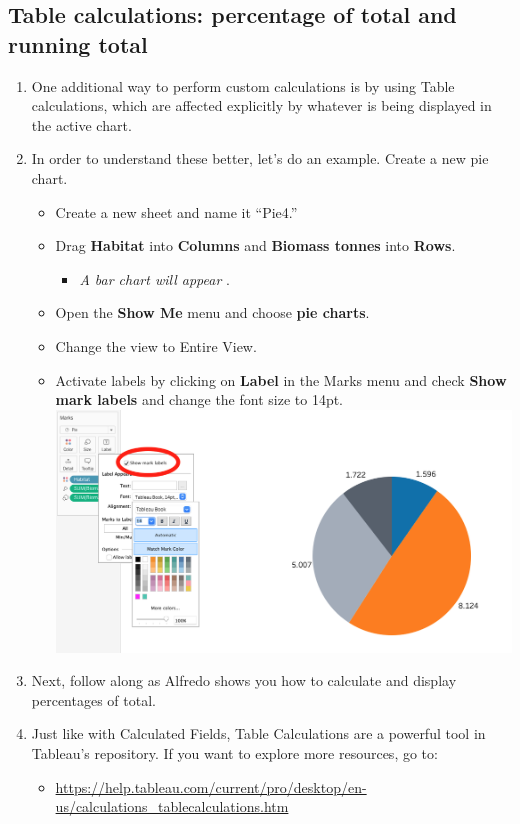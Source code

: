 \documentclass[
]{book}
\providecommand{\tightlist}{%
  \setlength{\itemsep}{0pt}\setlength{\parskip}{0pt}}
\begin{document}
\hypertarget{table-calculations-percentage-of-total-and-running-total}{%
\subsection{Table calculations: percentage of total and running total}\label{table-calculations-percentage-of-total-and-running-total}}

\begin{enumerate}
\def\labelenumi{\arabic{enumi}.}
\tightlist
\item
  One additional way to perform custom calculations is by using Table calculations, which are affected explicitly by whatever is being displayed in the active chart.
\item
  In order to understand these better, let's do an example. Create a new pie chart.

  \begin{itemize}
  \tightlist
  \item
    Create a new sheet and name it ``Pie4.''
  \item
    Drag \textbf{Habitat} into \textbf{Columns} and \textbf{Biomass tonnes} into \textbf{Rows}.

    \begin{itemize}
    \tightlist
    \item
      \emph{A bar chart will appear }.
    \end{itemize}
  \item
    Open the \textbf{Show Me} menu and choose \textbf{pie charts}.
  \item
    Change the view to Entire View.
  \item
    Activate labels by clicking on \textbf{Label} in the Marks menu and check \textbf{Show mark labels} and change the font size to 14pt.
    \includegraphics{images/m3s4_pie-show-labels.png}
  \end{itemize}
\item
  Next, follow along as Alfredo shows you how to calculate and display percentages of total.
\item
  Just like with Calculated Fields, Table Calculations are a powerful tool in Tableau's repository. If you want to explore more resources, go to:

  \begin{itemize}
  \tightlist
  \item
    \url{https://help.tableau.com/current/pro/desktop/en-us/calculations_tablecalculations.htm}
  \end{itemize}
\end{enumerate}
\end{document}
